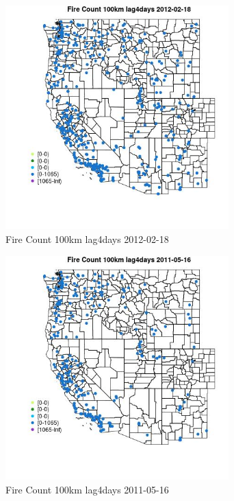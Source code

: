 \begin{figure} 
\centering  
\includegraphics[width=0.77\textwidth]{Code_Outputs/Report_ML_input_PM25_Step4_part_f_de_duplicated_aves_prioritize_24hr_obswNAs_MapObsFire_Count_100km_lag4days2012-02-18.jpg} 
\caption{\label{fig:Report_ML_input_PM25_Step4_part_f_de_duplicated_aves_prioritize_24hr_obswNAsMapObsFire_Count_100km_lag4days2012-02-18}Fire Count 100km lag4days 2012-02-18} 
\end{figure} 
 

\begin{figure} 
\centering  
\includegraphics[width=0.77\textwidth]{Code_Outputs/Report_ML_input_PM25_Step4_part_f_de_duplicated_aves_prioritize_24hr_obswNAs_MapObsFire_Count_100km_lag4days2011-05-16.jpg} 
\caption{\label{fig:Report_ML_input_PM25_Step4_part_f_de_duplicated_aves_prioritize_24hr_obswNAsMapObsFire_Count_100km_lag4days2011-05-16}Fire Count 100km lag4days 2011-05-16} 
\end{figure} 
 


